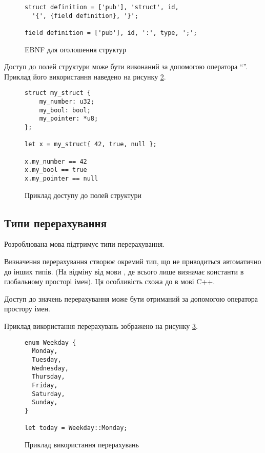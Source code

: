 \documentclass[main.tex]{subfiles}
\begin{document}
\begin{figure}[h]
  \centering
  \begin{verbatim}
struct definition = ['pub'], 'struct', id,
  '{', {field definition}, '}';

field definition = ['pub'], id, ':', type, ';';
  \end{verbatim}
  \caption{EBNF для оголошення структур}
  \label{ebnf:struct}
\end{figure}

Доступ до полей структури може бути виконаний за допомогою оператора ``''.
Приклад його використання наведено на рисунку \ref{lang:struct:access}.

\begin{figure}[h]
  \centering
  \begin{verbatim}
struct my_struct {
    my_number: u32;
    my_bool: bool;
    my_pointer: *u8;
};

let x = my_struct{ 42, true, null };

x.my_number == 42
x.my_bool == true
x.my_pointer == null
  \end{verbatim}
  \caption{Приклад доступу до полей структури}
  \label{lang:struct:access}
\end{figure}

\FloatBarrier
\subsection{Типи перерахування}
Розроблювана мова підтримує типи перерахування.

Визначення перерахування створює окремий тип, що не приводиться автоматично до інших типів. (На відміну від мови \LangC{}, де  всього лише визначає константи в глобальному просторі імен). Ця особливість схожа до  в мові C++\cite{c++:enums}.

Доступ до значень перерахування може бути отриманий за допомогою оператора простору імен.

Приклад використання перерахувань зображено на рисунку \ref{lang:enum}.

\begin{figure}[h]
  \centering
  \begin{verbatim}
enum Weekday {
  Monday,
  Tuesday,
  Wednesday,
  Thursday,
  Friday,
  Saturday,
  Sunday,
}

let today = Weekday::Monday;
  \end{verbatim}
  \caption{Приклад використання перерахувань}
  \label{lang:enum}
\end{figure}
\end{document}
